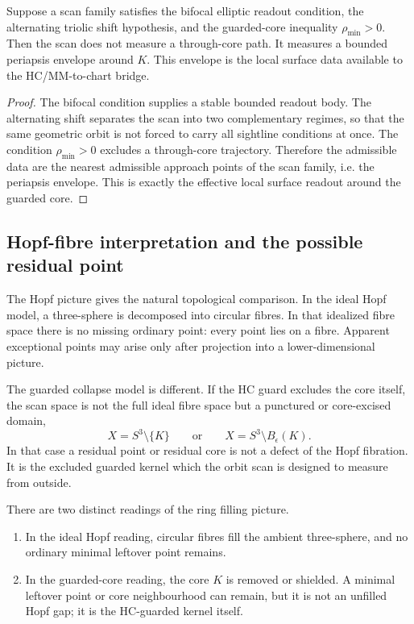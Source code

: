 \begin{proposition}
\label{prop:periapsis-envelope-core-surface-readout}
Suppose a scan family satisfies the bifocal elliptic readout condition, the alternating triolic shift hypothesis, and the guarded-core inequality $\rho_{\min}>0$.  Then the scan does not measure a through-core path.  It measures a bounded periapsis envelope around $K$.  This envelope is the local surface data available to the HC/MM-to-chart bridge.
\end{proposition}

\begin{proof}
The bifocal condition supplies a stable bounded readout body.  The alternating shift separates the scan into two complementary regimes, so that the same geometric orbit is not forced to carry all sightline conditions at once.  The condition $\rho_{\min}>0$ excludes a through-core trajectory.  Therefore the admissible data are the nearest admissible approach points of the scan family, i.e. the periapsis envelope.  This is exactly the effective local surface readout around the guarded core.
\end{proof}

\subsection{Hopf-fibre interpretation and the possible residual point}
\label{subsec:hopf-fibre-interpretation-residual-point}

The Hopf picture gives the natural topological comparison.  In the ideal Hopf model, a three-sphere is decomposed into circular fibres.  In that idealized fibre space there is no missing ordinary point: every point lies on a fibre.  Apparent exceptional points may arise only after projection into a lower-dimensional picture.

The guarded collapse model is different.  If the HC guard excludes the core itself, the scan space is not the full ideal fibre space but a punctured or core-excised domain,
\[
X = S^3\setminus\{K\}
\qquad\text{or}\qquad
X = S^3\setminus B_\epsilon(K).
\]
In that case a residual point or residual core is not a defect of the Hopf fibration.  It is the excluded guarded kernel which the orbit scan is designed to measure from outside.

\begin{proposition}
\label{prop:hopf-completion-vs-guarded-core-remainder}
There are two distinct readings of the ring filling picture.
\begin{enumerate}[label=\textup{(\alph*)}]
\item In the ideal Hopf reading, circular fibres fill the ambient three-sphere, and no ordinary minimal leftover point remains.
\item In the guarded-core reading, the core $K$ is removed or shielded.  A minimal leftover point or core neighbourhood can remain, but it is not an unfilled Hopf gap; it is the HC-guarded kernel itself.
\end{enumerate}
\end{proposition}

